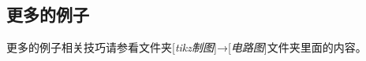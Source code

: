 \documentclass[11pt,oneside]{book}
\begin{document}
\begin{common-format}
{
}


\section{更多的例子}
更多的例子相关技巧请参看文件夹[\textit{tikz制图}]→[\textit{电路图}]文件夹里面的内容。









\end{common-format}
\end{document}
